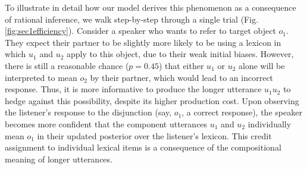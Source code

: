 To illustrate in detail how our model derives this phenomenon as a consequence of rational inference, we walk step-by-step through a single trial (Fig. \ref{fig:sec1efficiency}).
Consider a speaker who wants to refer to target object $o_1$. 
They expect their partner to be slightly more likely to be using a lexicon in which $u_{1}$ and $u_{2}$ apply to this object, due to their weak initial biases. 
However, there is still a reasonable chance ($p=0.45$) that either $u_1$ or $u_2$ alone will be interpreted to mean $o_2$ by their partner, which would lead to an incorrect response. 
Thus, it is more informative to produce the longer utterance $u_{1}u_{2}$ to hedge against this possibility, despite its higher production cost. 
Upon observing the listener's response to the disjunction (say, $o_1$, a correct response), the speaker becomes more confident that the component utterances $u_1$ and $u_2$ individually mean $o_1$ in their updated posterior over the listener's lexicon.
This credit assignment to individual lexical items is a consequence of the compositional meaning of longer utterances.

